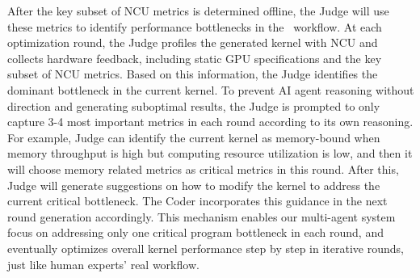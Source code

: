 After the key subset of NCU metrics is determined offline, the Judge will use these metrics to identify performance bottlenecks in the \agentname~workflow. At each optimization round, the Judge profiles the generated kernel with NCU and collects hardware feedback, including static GPU specifications and the key subset of NCU metrics.  Based on this information, the Judge identifies the dominant bottleneck in the current kernel. 
To prevent AI agent reasoning without direction and generating suboptimal results, the Judge is prompted to only capture 3-4 most important metrics in each round according to its own reasoning. For example, Judge can identify the current kernel as memory-bound when memory throughput is high but computing resource utilization is low, and then it will choose memory related metrics as critical metrics in this round. After this, Judge will generate suggestions on how to modify the kernel to address the current critical bottleneck. The Coder incorporates this guidance in the next round generation accordingly. This mechanism enables our multi-agent system focus on addressing only one critical program bottleneck in each round, and eventually optimizes overall kernel performance step by step in iterative rounds, just like human experts' real workflow. 


